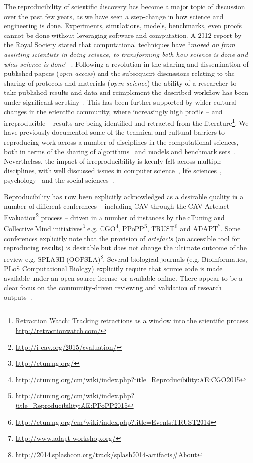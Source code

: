 \documentclass{llncs}
\begin{document}
The reproducibility of scientific discovery has become a major topic
of discussion over the past few years, as we have seen a step-change
in how science and engineering is done. Experiments, simulations,
models, benchmarks, even proofs cannot be done without leveraging
software and computation. A 2012 report by the Royal Society stated
that computational techniques have ``{\emph{moved on from assisting
scientists in doing science, to transforming both how science is done
and what science is done}}''~\cite{rssaaoe:2012}. Following a
revolution in the sharing and dissemination of published papers
(\emph{open access}) and the subsequent discussions relating to the
sharing of protocols and materials (\emph{open science}) the ability
of a researcher to take published results and data and reimplement the
described workflow has been under significant
scrutiny~\cite{stodden-et-al:2013,sandve-et-al:2013,gent:2013,wilson-et-al:2014}. This
has been further supported by wider cultural changes in the scientific
community, where increasingly high profile -- and irreproducible --
results are being identified and retracted from the
literature\footnote{Retraction Watch: Tracking retractions as a window
into the scientific process\\\url{http://retractionwatch.com/}}.  We
have previously documented some of the technical and cultural barriers
to reproducing work across a number of disciplines in the
computational sciences, both in terms of the sharing of
algorithms~\cite{crick-et-al_recomp2014} and models and benchmark
sets~\cite{crick-et-al_wssspe2}. Nevertheless, the impact of
irreproducibility is keenly felt across multiple disciplines, with
well discussed issues in computer science~\cite{collberg-et-al:2014},
life sciences~\cite{rollins-et-al:2014},
psychology~\cite{chambers-et-al:2014} and the social
sciences~\cite{conte-et-al:2012}.

Reproducibility has now been explicitly acknowledged as a desirable
quality in a number of different conferences -- including CAV through
the CAV Artefact
Evaluation\footnote{\url{http://i-cav.org/2015/evaluation/}} process
-- driven in a number of instances by the cTuning and Collective Mind
initiatives\footnote{\url{http://ctuning.org/}}
e.g. CGO\footnote{\url{http://ctuning.org/cm/wiki/index.php?title=Reproducibility:AE:CGO2015}},
PPoPP\footnote{\url{http://ctuning.org/cm/wiki/index.php?title=Reproducibility:AE:PPoPP2015}},
TRUST\footnote{\url{http://ctuning.org/cm/wiki/index.php?title=Events:TRUST2014}}
and ADAPT\footnote{\url{http://www.adapt-workshop.org/}}. Some
conferences explicitly note that the provision of \emph{artefacts} (an
accessible tool for reproducing results) is desirable but does not
change the ultimate outcome of the review e.g. SPLASH
(OOPSLA)\footnote{\url{http://2014.splashcon.org/track/splash2014-artifacts\#About}}.
Several biological journals (e.g. Bioinformatics, PLoS Computational
Biology) explicitly require that source code is made available under
an open source license, or available online. There appear to be a
clear focus on the community-driven reviewing and validation of
research outputs~\cite{fursin+dubach:2014}.
\end{document}
